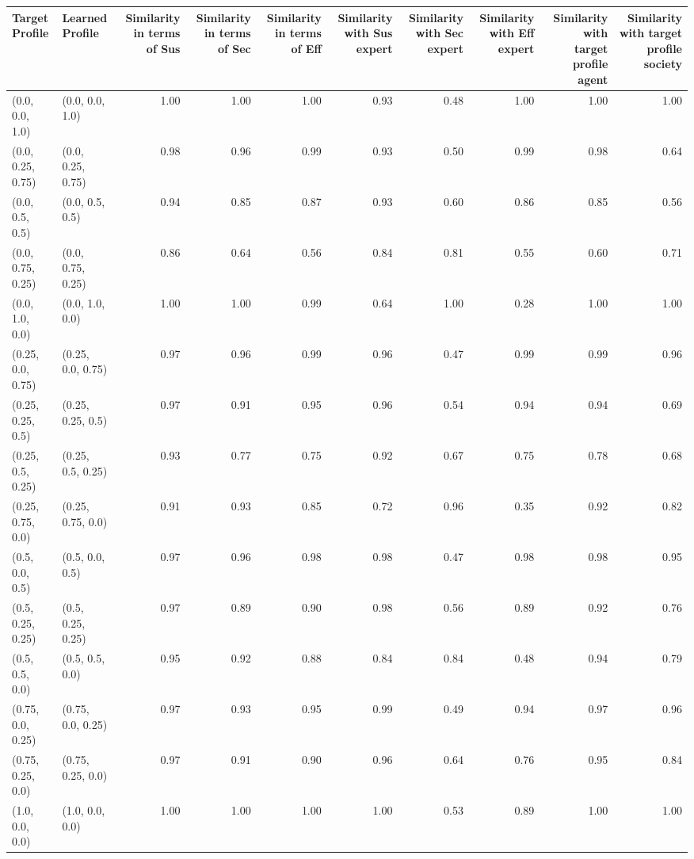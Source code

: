 \begin{tabular}{llrrrrrrrr}
\toprule
Target Profile & Learned Profile & Similarity in terms of Sus & Similarity in terms of Sec & Similarity in terms of Eff & Similarity with Sus expert & Similarity with Sec expert & Similarity with Eff expert & Similarity with target profile agent & Similarity with target profile society \\
\midrule
(0.0, 0.0, 1.0) & (0.0, 0.0, 1.0) & 1.00 & 1.00 & 1.00 & 0.93 & 0.48 & 1.00 & 1.00 & 1.00 \\
(0.0, 0.25, 0.75) & (0.0, 0.25, 0.75) & 0.98 & 0.96 & 0.99 & 0.93 & 0.50 & 0.99 & 0.98 & 0.64 \\
(0.0, 0.5, 0.5) & (0.0, 0.5, 0.5) & 0.94 & 0.85 & 0.87 & 0.93 & 0.60 & 0.86 & 0.85 & 0.56 \\
(0.0, 0.75, 0.25) & (0.0, 0.75, 0.25) & 0.86 & 0.64 & 0.56 & 0.84 & 0.81 & 0.55 & 0.60 & 0.71 \\
(0.0, 1.0, 0.0) & (0.0, 1.0, 0.0) & 1.00 & 1.00 & 0.99 & 0.64 & 1.00 & 0.28 & 1.00 & 1.00 \\
(0.25, 0.0, 0.75) & (0.25, 0.0, 0.75) & 0.97 & 0.96 & 0.99 & 0.96 & 0.47 & 0.99 & 0.99 & 0.96 \\
(0.25, 0.25, 0.5) & (0.25, 0.25, 0.5) & 0.97 & 0.91 & 0.95 & 0.96 & 0.54 & 0.94 & 0.94 & 0.69 \\
(0.25, 0.5, 0.25) & (0.25, 0.5, 0.25) & 0.93 & 0.77 & 0.75 & 0.92 & 0.67 & 0.75 & 0.78 & 0.68 \\
(0.25, 0.75, 0.0) & (0.25, 0.75, 0.0) & 0.91 & 0.93 & 0.85 & 0.72 & 0.96 & 0.35 & 0.92 & 0.82 \\
(0.5, 0.0, 0.5) & (0.5, 0.0, 0.5) & 0.97 & 0.96 & 0.98 & 0.98 & 0.47 & 0.98 & 0.98 & 0.95 \\
(0.5, 0.25, 0.25) & (0.5, 0.25, 0.25) & 0.97 & 0.89 & 0.90 & 0.98 & 0.56 & 0.89 & 0.92 & 0.76 \\
(0.5, 0.5, 0.0) & (0.5, 0.5, 0.0) & 0.95 & 0.92 & 0.88 & 0.84 & 0.84 & 0.48 & 0.94 & 0.79 \\
(0.75, 0.0, 0.25) & (0.75, 0.0, 0.25) & 0.97 & 0.93 & 0.95 & 0.99 & 0.49 & 0.94 & 0.97 & 0.96 \\
(0.75, 0.25, 0.0) & (0.75, 0.25, 0.0) & 0.97 & 0.91 & 0.90 & 0.96 & 0.64 & 0.76 & 0.95 & 0.84 \\
(1.0, 0.0, 0.0) & (1.0, 0.0, 0.0) & 1.00 & 1.00 & 1.00 & 1.00 & 0.53 & 0.89 & 1.00 & 1.00 \\
\bottomrule
\end{tabular}
